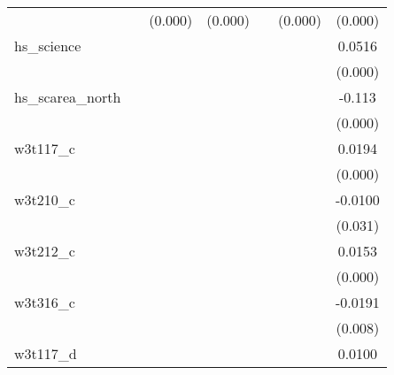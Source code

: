 {\begin{tabular}{l*{6}{c}}
            &                     &     (0.000)         &     (0.000)         &                     &     (0.000)         &     (0.000)         \\
[1em]
hs\_science  &                     &                     &                     &                     &                     &      0.0516\sym{***}\\
            &                     &                     &                     &                     &                     &     (0.000)         \\
[1em]
hs\_scarea\_north&                     &                     &                     &                     &                     &      -0.113\sym{***}\\
            &                     &                     &                     &                     &                     &     (0.000)         \\
[1em]
w3t117\_c    &                     &                     &                     &                     &                     &      0.0194\sym{***}\\
            &                     &                     &                     &                     &                     &     (0.000)         \\
[1em]
w3t210\_c    &                     &                     &                     &                     &                     &     -0.0100\sym{**} \\
            &                     &                     &                     &                     &                     &     (0.031)         \\
[1em]
w3t212\_c    &                     &                     &                     &                     &                     &      0.0153\sym{***}\\
            &                     &                     &                     &                     &                     &     (0.000)         \\
[1em]
w3t316\_c    &                     &                     &                     &                     &                     &     -0.0191\sym{***}\\
            &                     &                     &                     &                     &                     &     (0.008)         \\
[1em]
w3t117\_d    &                     &                     &                     &                     &                     &      0.0100\sym{*}  \\

\end{tabular}}

